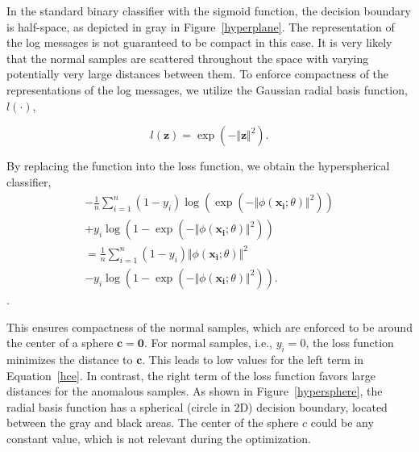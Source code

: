 In the standard binary classifier with the sigmoid function, the decision boundary is half-space, as depicted in gray in Figure~\ref{hyperplane}. The representation of the log messages is not guaranteed to be compact in this case. It is very likely that the normal samples are scattered throughout the space with varying potentially very large distances between them. To enforce compactness of the representations of the log messages, we utilize the Gaussian radial basis function, $l(\cdot)$,

\begin{equation}
    l(\mathbf{z})= \exp(-\Vert \mathbf{z} \Vert ^2).
\end{equation}

By replacing the function into the loss function, we obtain the hyperspherical classifier,
\begin{equation}\begin{aligned}
    - \frac{1}{n}\sum_{i=1}^{n}(1-y_i)\log(\exp(-\Vert \phi(\mathbf{x_i}; \theta) \Vert ^2)) \\
    +  y_i\log(1-\exp(-\Vert \phi(\mathbf{x_i}; \theta) \Vert ^2)) \\
    =  \frac{1}{n}\sum_{i=1}^{n}(1-y_i)\Vert \phi(\mathbf{x_i}; \theta) \Vert ^2 \\
    -  y_i\log(1-\exp(-\Vert \phi(\mathbf{x_i}; \theta) \Vert ^2)).\end{aligned}
\label{hce}
\end{equation}.


This ensures compactness of the normal samples, which are enforced to be around the center of a sphere $\mathbf{c}=\mathbf{0}$. For normal samples, i.e., $y_i=0$, the loss function minimizes the distance to $\mathbf{c}$. This leads to low values for the left term in Equation~\ref{hce}. In contrast, the right term of the loss function favors large distances for the anomalous samples. As shown in Figure~\ref{hypersphere}, the radial basis function has a spherical (circle in 2D) decision boundary, located between the gray and black areas. The center of the sphere $c$ could be any constant value, which is not relevant during the optimization.


